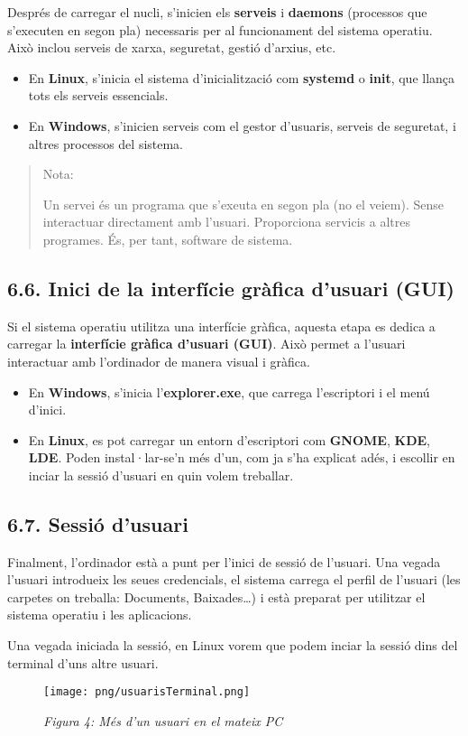 \documentclass[
  a4paper,
]{article}
\begin{document}
Després de carregar el nucli, s'inicien els \textbf{serveis} i
\textbf{daemons} (processos que s'executen en segon pla) necessaris per
al funcionament del sistema operatiu. Això inclou serveis de xarxa,
seguretat, gestió d'arxius, etc.

\begin{itemize}
\item
  En \textbf{Linux}, s'inicia el sistema d'inicialització com
  \textbf{systemd} o \textbf{init}, que llança tots els serveis
  essencials.
\item
  En \textbf{Windows}, s'inicien serveis com el gestor d'usuaris,
  serveis de seguretat, i altres processos del sistema.
\end{itemize}

\begin{quote}
Nota:

Un servei és un programa que s'exeuta en segon pla (no el veiem). Sense
interactuar directament amb l'usuari. Proporciona servicis a altres
programes. És, per tant, software de sistema.
\end{quote}

\subsection{6.6. Inici de la interfície gràfica d'usuari
(GUI)}\label{inici-de-la-interfuxedcie-gruxe0fica-dusuari-gui}

Si el sistema operatiu utilitza una interfície gràfica, aquesta etapa es
dedica a carregar la \textbf{interfície gràfica d'usuari (GUI)}. Això
permet a l'usuari interactuar amb l'ordinador de manera visual i
gràfica.

\begin{itemize}
\item
  En \textbf{Windows}, s'inicia l'\textbf{explorer.exe}, que carrega
  l'escriptori i el menú d'inici.
\item
  En \textbf{Linux}, es pot carregar un entorn d'escriptori com
  \textbf{GNOME}, \textbf{KDE}, \textbf{LDE}. Poden instal·lar-se'n més
  d'un, com ja s'ha explicat adés, i escollir en inciar la sessió
  d'usuari en quin volem treballar.
\end{itemize}

\subsection{6.7. Sessió d'usuari}\label{sessiuxf3-dusuari}

Finalment, l'ordinador està a punt per l'inici de sessió de l'usuari.
Una vegada l'usuari introdueix les seues credencials, el sistema carrega
el perfil de l'usuari (les carpetes on treballa: Documents,
Baixades\ldots) i està preparat per utilitzar el sistema operatiu i les
aplicacions.

Una vegada iniciada la sessió, en Linux vorem que podem inciar la sessió
dins del terminal d'uns altre usuari.

\begin{figure}
\centering
\texttt{[image: png/usuarisTerminal.png]}
\caption{\emph{Figura 4: Més d'un usuari en el mateix PC}}
\end{figure}
\end{document}
